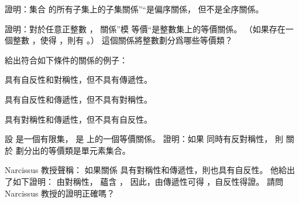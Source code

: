\startsection[
  title={Relations},
]

\startEXERCISE
證明：集合 \m{\integers} 的所有子集上的子集關係”\m{\subseteq}“是偏序關係，
但不是全序關係。
\stopEXERCISE

\startANSWER
{}
\stopANSWER

\startEXERCISE
證明：對於任意正整數 ，
關係”模  等價“是整數集上的等價關係。
（如果存在一個整數 ，使得 ，則有 。）
這個關係將整數劃分爲哪些等價類？
\stopEXERCISE

\startANSWER
{}
\stopANSWER

\startEXERCISE
給出符合如下條件的關係的例子：

\startigBase[a]\startitem
具有自反性和對稱性，但不具有傳遞性。
\stopitem\stopigBase

\startigBase[continue]\startitem
具有自反性和傳遞性，但不具有對稱性。
\stopitem\stopigBase

\startigBase[continue]\startitem
具有對稱性和傳遞性，但不具有自反性。
\stopitem\stopigBase
\stopEXERCISE

\startANSWER
{}
\stopANSWER

\startEXERCISE
設  是一個有限集，  是  上的一個等價關係。
證明：如果  同時有反對稱性，
則  關於  劃分出的等價類是單元素集合。
\stopEXERCISE

\startANSWER
{}
\stopANSWER

\startEXERCISE
Narcissus 教授聲稱：
如果關係  具有對稱性和傳遞性，則也具有自反性。
他給出了如下證明：
由對稱性，  蘊含 ，
因此，由傳遞性可得 ，自反性得證。
請問 Narcissus 教授的證明正確嗎？
\stopEXERCISE

\startANSWER
{}
\stopANSWER

\stopsection
